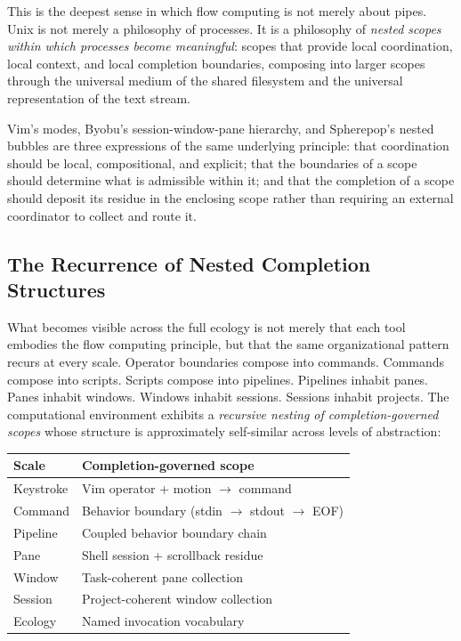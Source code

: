 \documentclass[12pt, a4paper]{article}
\begin{document}
This is the deepest sense in which flow computing is not merely
about pipes. Unix is not merely a philosophy of processes. It
is a philosophy of \emph{nested scopes within which processes
become meaningful}: scopes that provide local coordination,
local context, and local completion boundaries, composing into
larger scopes through the universal medium of the shared
filesystem and the universal representation of the text stream.

Vim's modes, Byobu's session-window-pane hierarchy, and
Spherepop's nested bubbles are three expressions of the same
underlying principle: that coordination should be local,
compositional, and explicit; that the boundaries of a scope
should determine what is admissible within it; and that the
completion of a scope should deposit its residue in the
enclosing scope rather than requiring an external coordinator
to collect and route it.

\subsection{The Recurrence of Nested Completion Structures}

What becomes visible across the full ecology is not merely
that each tool embodies the flow computing principle, but that
the same organizational pattern recurs at every scale. Operator
boundaries compose into commands. Commands compose into scripts.
Scripts compose into pipelines. Pipelines inhabit panes. Panes
inhabit windows. Windows inhabit sessions. Sessions inhabit
projects. The computational environment exhibits a
\emph{recursive nesting of completion-governed scopes} whose
structure is approximately self-similar across levels of
abstraction:

\begin{center}
\begin{tabular}{ll}
\textbf{Scale} & \textbf{Completion-governed scope} \\
\hline
Keystroke & Vim operator + motion $\to$ command \\
Command & Behavior boundary (stdin $\to$ stdout $\to$ EOF) \\
Pipeline & Coupled behavior boundary chain \\
Pane & Shell session + scrollback residue \\
Window & Task-coherent pane collection \\
Session & Project-coherent window collection \\
Ecology & Named invocation vocabulary \\
\end{tabular}
\end{center}
\end{document}
